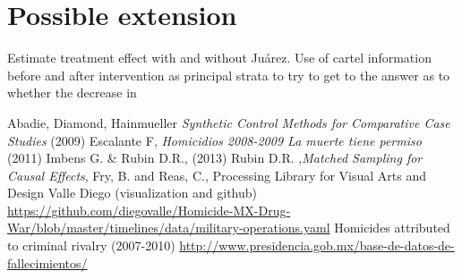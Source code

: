 \documentclass{article}[11 pt]
\begin{document}
\section{Possible extension}
Estimate treatment effect with and without Ju\'{a}rez.
Use of cartel information before and after intervention as principal strata to try to get to the answer as to whether the decrease in 


        \begin{thebibliography}{99}
           Abadie, Diamond, Hainmueller  \emph{Synthetic Control Methods for Comparative Case Studies} (2009)
           Escalante F, \emph{Homicidios 2008-2009 La muerte tiene permiso} (2011)
           Imbens G. \& Rubin D.R., (2013)
           Rubin D.R. ,\emph{Matched Sampling for Causal Effects},
 Fry, B. and Reas, C., Processing Library for Visual Arts and Design
            Valle Diego (visualization and github) \url{https://github.com/diegovalle/Homicide-MX-Drug-War/blob/master/timelines/data/military-operations.yaml}
		Homicides attributed to criminal rivalry (2007-2010)
	\url{http://www.presidencia.gob.mx/base-de-datos-de-fallecimientos/}          
\end{thebibliography}

\end{document}
